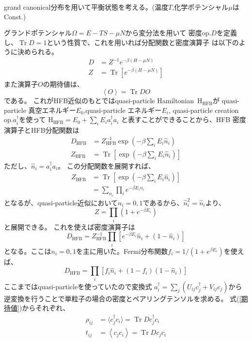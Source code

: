 \documentclass[a4paper,11pt]{jsarticle}
\begin{document}
grand canonical分布を用いて平衡状態を考える。(温度$T$,化学ポテンシャル$\mu$はConst.)
  
  グランドポテンシャル$\Omega=E- TS -\mu N$から変分法を用いて
  密度op.$D$を定義し、$\operatorname{Tr}D=1$という性質で、これを用いれば分配関数と密度演算子
  は以下のように決められる。
  \begin{align}
    D &= Z^{-1}e^{-\beta(H-\mu N)}\\
    Z &= \operatorname{Tr}\left[e^{-\beta(H-\mu N)}\right]
  \end{align}
  また演算子$O$の期待値は、
  \begin{equation}
    \left\langle O\right\rangle=\operatorname{Tr}DO\label{期待値}
  \end{equation}
  である。
  これがHFB近似のもとではquasi-particle Hamiltonian\ $\operatorname{H_{\text{HFB}}}$が
  quasi-particle 真空エネルギー$E_0$,quasi-particle エネルギー$E_i$,
  quasi-particle creation op.$a_i^{\dagger}$を使って
  $\operatorname{H_{\text{HFB}}}=E_0 + \sum_{i}E_i a_i^{\dagger}a_i$
  と表すことができることから、HFB 密度演算子とHFB分配関数は
  \begin{align}
    D_{\text{HFB}} &= Z_{\text{HFB}}^{-1}\exp\left(-\beta \sum_i E_i \hat{n}_i\right)\\
    Z_{\text{HFB}} &= \operatorname{Tr}\left[\exp\left(-\beta \sum_i E_i \hat{n}_i\right)\right]
  \end{align}
  ただし、$\hat{n}_i = a_i^{\dagger}a_i$。
  この分配関数を展開すれば、
  \begin{align}
    Z_{\text{HFB}} &= \operatorname{Tr}\left[\exp\left(-\beta \sum_i E_i \hat{n}_i\right)\right]\\
    &= \sum_{n_i}\prod _{i} e^{-\beta E_i n_i}
  \end{align}
  となるが、quasi-particle近似において$n_i=0,1$であるから、$\hat{n}_i^2=\hat{n}_i$より、
  \begin{equation}
    Z=\prod _{i} \left(1 + e^{-\beta E_i}\right)
  \end{equation}
  と展開できる。
  これを使えば密度演算子は
  \begin{equation}
    D_{\text{HFB}} = Z_{\text{HFB}}^{-1}\prod _{i}
    \left[e^{-\beta E_i}\hat{n}_i + (1 - \hat{n}_i)\right]
  \end{equation}
  となる。ここは$n_i=0,1$を主に用いた。Fermi分布関数$f_i=1/(1 + e^{\beta E_i})$を使えば、
  \begin{equation}
    D_{\text{HFB}}=\prod_i \left[f_i\hat{n}_i+(1 - f_i)(1 - \hat{n}_i)\right]
  \end{equation}
  ここまではquasi-particleを使っていたので変換式
  $a_i^{\dagger} = \sum_{j}(U_{ij}c_j^{\dagger}+V_{ij}c_j)$から
  逆変換を行うことで単粒子の場合の密度とペアリングテンソルを求める。
  式(\ref{期待値})からそれぞれ、
  \begin{align}
    \rho_{ij} &= \langle c_j^\dagger c_i\rangle=\operatorname{Tr}D c_j^\dagger c_i\\
    t_{ij}    &= \left\langle c_j c_i\right\rangle=\operatorname{Tr}D c_j c_i
  \end{align}
\end{document}
